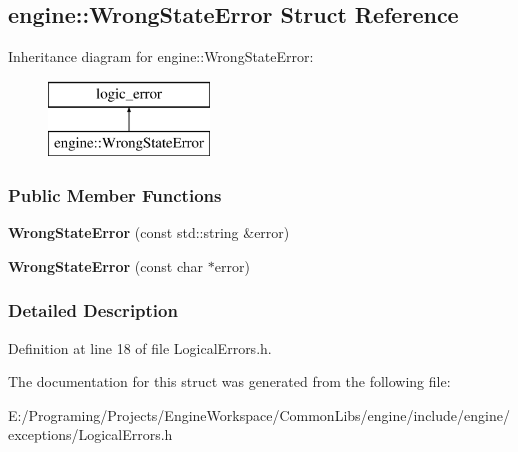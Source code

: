 \hypertarget{a00093}{}\subsection{engine\+:\+:Wrong\+State\+Error Struct Reference}
\label{a00093}
Inheritance diagram for engine\+:\+:Wrong\+State\+Error\+:\begin{figure}[H]
\begin{center}
\leavevmode
\includegraphics[height=2.000000cm]{a00093}
\end{center}
\end{figure}
\subsubsection*{Public Member Functions}
\begin{DoxyCompactItemize}
\item 
{\bfseries Wrong\+State\+Error} (const std\+::string \&error)\hypertarget{a00093_a2c4332149aa8e41ffcef52a21727d03d}{}\label{a00093_a2c4332149aa8e41ffcef52a21727d03d}

\item 
{\bfseries Wrong\+State\+Error} (const char $\ast$error)\hypertarget{a00093_a279d5a0c8c39380af223092423d1f56c}{}\label{a00093_a279d5a0c8c39380af223092423d1f56c}

\end{DoxyCompactItemize}


\subsubsection{Detailed Description}


Definition at line 18 of file Logical\+Errors.\+h.



The documentation for this struct was generated from the following file\+:\begin{DoxyCompactItemize}
\item 
E\+:/\+Programing/\+Projects/\+Engine\+Workspace/\+Common\+Libs/engine/include/engine/exceptions/Logical\+Errors.\+h\end{DoxyCompactItemize}
